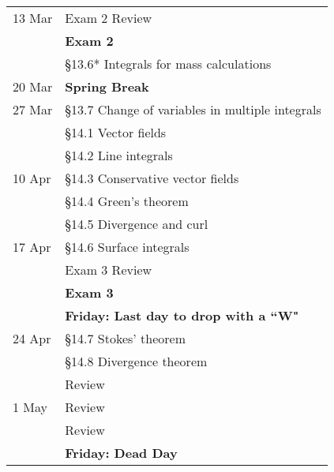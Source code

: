 \documentclass[%
]{article}
\begin{document}
\begin{center}
\begin{supertabular}{p{0.15\textwidth}p{0.75\textwidth}}
13 Mar & Exam 2 Review \\
 & {\bf Exam 2} \\ 
 & \S 13.6* Integrals for mass calculations \\
20 Mar & {\bf Spring Break} \\
27 Mar & \S 13.7 Change of variables in multiple integrals \\ 
 & \S 14.1 Vector fields \\
 & \S 14.2 Line integrals \\
10 Apr & \S 14.3 Conservative vector fields \\
 & \S 14.4 Green's theorem \\
 & \S 14.5 Divergence and curl \\
17 Apr & \S 14.6 Surface integrals \\
 & Exam 3 Review \\
 & {\bf Exam 3} \\
 & {\bf Friday: Last day to drop with a ``W"} \\
24 Apr & \S 14.7 Stokes' theorem \\
 & \S 14.8 Divergence theorem \\
 & Review \\
1 May & Review \\
 & Review \\
 & {\bf Friday: Dead Day} \\
\end{supertabular}
\end{center} 
\end{document}
